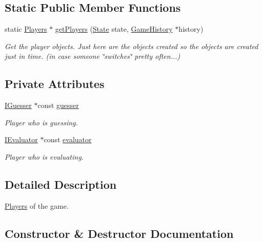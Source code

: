 \subsection*{Static Public Member Functions}
\begin{DoxyCompactItemize}
\item 
static \hyperlink{classmastermind_1_1shell_1_1_players}{Players} $\ast$ \hyperlink{classmastermind_1_1shell_1_1_players_a5e8a48c86167f6bb947408bd7614c047}{get\+Players} (\hyperlink{classmastermind_1_1shell_1_1_state}{State} state, \hyperlink{classmastermind_1_1logic_1_1_game_history}{Game\+History} $\ast$history)
\begin{DoxyCompactList}\small\item\em Get the player objects. Just here are the objects created so the objects are created just in time. (in case someone \char`\"{}switches\char`\"{} pretty often...) \end{DoxyCompactList}\end{DoxyCompactItemize}
\subsection*{Private Attributes}
\begin{DoxyCompactItemize}
\item 
\hyperlink{classmastermind_1_1logic_1_1_i_guesser}{I\+Guesser} $\ast$const \hyperlink{classmastermind_1_1shell_1_1_players_aec78e6a571eed40e72d1822da38346cb}{guesser}
\begin{DoxyCompactList}\small\item\em Player who is guessing. \end{DoxyCompactList}\item 
\hyperlink{classmastermind_1_1logic_1_1_i_evaluator}{I\+Evaluator} $\ast$const \hyperlink{classmastermind_1_1shell_1_1_players_ab5def272c1a430a8d0c388a93e7479d3}{evaluator}
\begin{DoxyCompactList}\small\item\em Player who is evaluating. \end{DoxyCompactList}\end{DoxyCompactItemize}


\subsection{Detailed Description}
\hyperlink{classmastermind_1_1shell_1_1_players}{Players} of the game. 

\subsection{Constructor \& Destructor Documentation}
\hypertarget{classmastermind_1_1shell_1_1_players_a0789193995383df718119738773a4d45}{}\label{classmastermind_1_1shell_1_1_players_a0789193995383df718119738773a4d45} 
